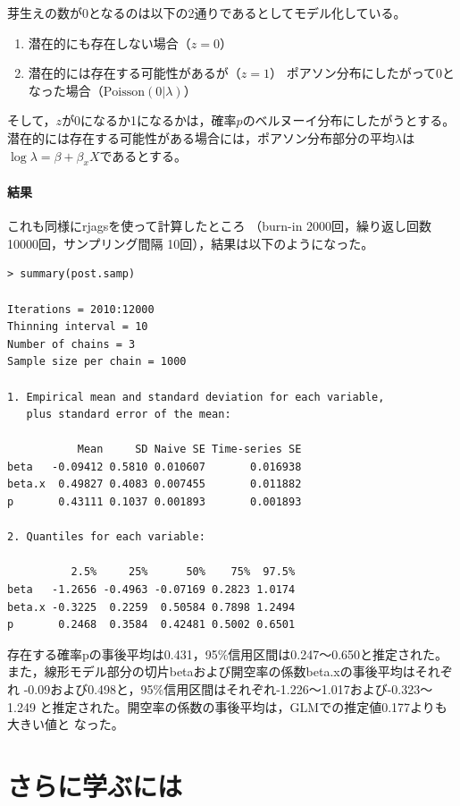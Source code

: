 \documentclass[11pt,uplatex]{jsarticle}
\begin{document}

芽生えの数が0となるのは以下の2通りであるとしてモデル化している。
\begin{enumerate}
\item 潜在的にも存在しない場合（$z=0$）
\item 潜在的には存在する可能性があるが（$z=1$）
ポアソン分布にしたがって0となった場合（$\mathrm{Poisson}(0|\lambda)$）
\end{enumerate}
そして，$z$が0になるか1になるかは，確率$p$のベルヌーイ分布にしたがうとする。
潜在的には存在する可能性がある場合には，ポアソン分布部分の平均$\lambda$は
$\log\lambda = \beta + \beta_{x}X$であるとする。


\paragraph{結果}
これも同様に\textsf{rjags}を使って計算したところ
（burn-in 2000回，繰り返し回数 10000回，サンプリング間隔 10回），結果は以下のようになった。

\begin{lstlisting}
> summary(post.samp)

Iterations = 2010:12000
Thinning interval = 10 
Number of chains = 3 
Sample size per chain = 1000 

1. Empirical mean and standard deviation for each variable,
   plus standard error of the mean:

           Mean     SD Naive SE Time-series SE
beta   -0.09412 0.5810 0.010607       0.016938
beta.x  0.49827 0.4083 0.007455       0.011882
p       0.43111 0.1037 0.001893       0.001893

2. Quantiles for each variable:

          2.5%     25%      50%    75%  97.5%
beta   -1.2656 -0.4963 -0.07169 0.2823 1.0174
beta.x -0.3225  0.2259  0.50584 0.7898 1.2494
p       0.2468  0.3584  0.42481 0.5002 0.6501

\end{lstlisting}
存在する確率pの事後平均は0.431，95\%信用区間は0.247〜0.650と推定された。
また，線形モデル部分の切片betaおよび開空率の係数beta.xの事後平均はそれぞれ
-0.09および0.498と，95\%信用区間はそれぞれ-1.226〜1.017および-0.323〜1.249
と推定された。開空率の係数の事後平均は，GLMでの推定値0.177よりも大きい値と
なった。


\section{さらに学ぶには}
\end{document}
